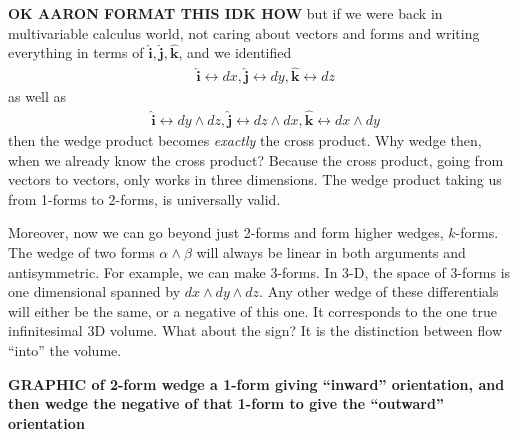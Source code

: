 	\textbf{OK AARON FORMAT THIS IDK HOW}
	but if we were back in multivariable calculus world, not caring about vectors and forms and writing everything in terms of $\hat{\mathbf{i}}, \hat{\mathbf{j}}, \hat{\mathbf{k}}$, and we identified 
	\begin{align*}
		&\hat{\mathbf{i}} \leftrightarrow dx, \hat{\mathbf{j}} \leftrightarrow dy, \hat{\mathbf{k}} \leftrightarrow dz 
	\end{align*}
	as well as
	\begin{align*}
		&\hat{\mathbf{i}} \leftrightarrow dy \wedge dz, \hat{\mathbf{j}} \leftrightarrow dz \wedge dx, \hat{\mathbf{k}} \leftrightarrow dx \wedge dy
	\end{align*}
	then the wedge product becomes \emph{exactly} the cross product. Why wedge then, when we already know the cross product? Because the cross product, going from vectors to vectors, only works in three dimensions. The wedge product taking us from 1-forms to 2-forms, is universally valid.
	
	Moreover, now we can go beyond just 2-forms and form higher wedges, $k$-forms. The wedge of two forms $\alpha \wedge \beta$ will always be linear in both arguments and antisymmetric. For example, we can make 3-forms. In 3-D, the space of 3-forms is one dimensional spanned by $dx \wedge dy \wedge dz$. Any other wedge of these differentials will either be the same, or a negative of this one. It corresponds to the one true infinitesimal 3D volume. What about the sign? It is the distinction between flow ``into'' the volume.
	
	\textbf{GRAPHIC of 2-form wedge a 1-form giving ``inward'' orientation, and then wedge the negative of that 1-form to give the ``outward'' orientation}
	
